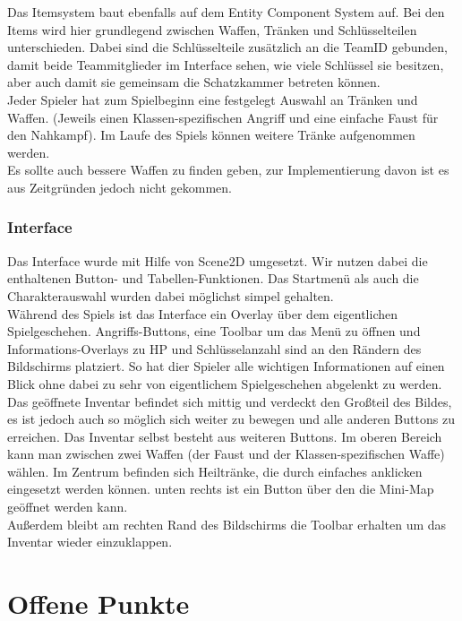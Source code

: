 \documentclass[10pt,a4paper,notitlepage]{scrreprt}
\begin{document}
		Das Itemsystem baut ebenfalls auf dem Entity Component System auf. Bei den Items wird hier grundlegend zwischen Waffen, Tränken und Schlüsselteilen unterschieden. Dabei sind die Schlüsselteile zusätzlich an die TeamID gebunden, damit beide Teammitglieder im Interface sehen, wie viele Schlüssel sie besitzen, aber auch damit sie gemeinsam die Schatzkammer betreten können.\\
		Jeder Spieler hat zum Spielbeginn eine festgelegt Auswahl an Tränken und Waffen. (Jeweils einen Klassen-spezifischen Angriff und eine einfache Faust für den Nahkampf). Im Laufe des Spiels können weitere Tränke aufgenommen werden.\\
		Es sollte auch bessere Waffen zu finden geben, zur Implementierung davon ist es aus Zeitgründen jedoch nicht gekommen.\\
		
		\subsubsection{Interface}
		
		Das Interface wurde mit Hilfe von Scene2D umgesetzt. Wir nutzen dabei die enthaltenen Button- und Tabellen-Funktionen. Das Startmenü als auch die Charakterauswahl wurden dabei möglichst simpel gehalten.\\
		Während des Spiels ist das Interface ein Overlay über dem eigentlichen Spielgeschehen. Angriffs-Buttons, eine Toolbar um das Menü zu öffnen und Informations-Overlays zu HP und Schlüsselanzahl sind an den Rändern des Bildschirms platziert. So hat dier Spieler alle wichtigen Informationen auf einen Blick ohne dabei zu sehr von eigentlichem Spielgeschehen abgelenkt zu werden.\\
		Das geöffnete Inventar befindet sich mittig und verdeckt den Großteil des Bildes, es ist jedoch auch so möglich sich weiter zu bewegen und alle anderen Buttons zu erreichen. Das Inventar selbst besteht aus weiteren Buttons. Im oberen Bereich kann man zwischen zwei Waffen (der Faust und der Klassen-spezifischen Waffe) wählen. Im Zentrum befinden sich Heiltränke, die durch einfaches anklicken eingesetzt werden können. unten rechts ist ein Button über den die Mini-Map geöffnet werden kann.\\
		Außerdem bleibt am rechten Rand des Bildschirms die Toolbar erhalten um das Inventar wieder einzuklappen.\\

	\section{Offene Punkte}
\end{document}
